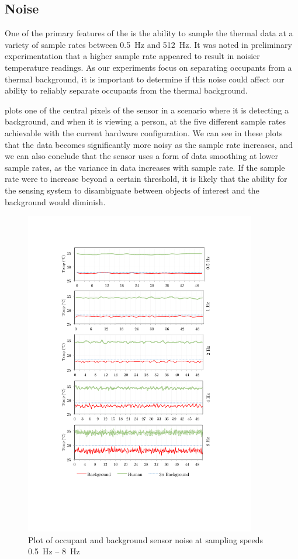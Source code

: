 \documentclass[../thesis/thesis.tex]{subfiles}
\begin{document}
\subsection{Noise}

One of the primary features of the \mlx is the ability to sample the thermal data at a variety of sample rates between 0.5~Hz and 512~Hz. It was noted in preliminary experimentation that a higher sample rate appeared to result in noisier temperature readings. As our experiments focus on separating occupants from a thermal background, it is important to determine if this noise could affect our ability to reliably separate occupants from the thermal background.

 plots one of the central pixels of the sensor in a scenario where it is detecting a background, and when it is viewing a person, at the five different sample rates achievable with the current hardware configuration. We can see in these plots that the data becomes significantly more noisy as the sample rate increases, and we can also conclude that the sensor uses a form of data smoothing at lower sample rates, as the variance in data increases with sample rate. If the sample rate were to increase beyond a certain threshold, it is likely that the ability for the sensing system to disambiguate between objects of interest and the background would diminish.

\begin{figure}
  \centering
  \includegraphics[width=0.9\textwidth]{../diagrams/noise-graph3.pdf}
  \caption{Plot of occupant and background sensor noise at sampling speeds 0.5~Hz -- 8~Hz}
  \label{fig:noise} %
\end{figure}
\end{document}
